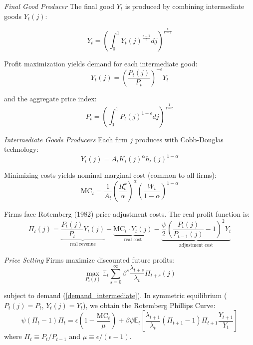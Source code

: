 \documentclass[11pt,preprint]{elsarticle}
\numberwithin{equation}{section}
\numberwithin{figure}{section}
\numberwithin{table}{section}
\begin{document}
\newpage

\emph{Final Good Producer} The final good \(Y_t\) is produced by
combining intermediate goods \(Y_t(j)\):

\begin{equation}
Y_t = \left( \int_0^1 Y_t(j)^{\frac{\epsilon-1}{\epsilon}} dj \right)^{\frac{\epsilon}{\epsilon-1}}
\label{final_good_production}
\end{equation}

Profit maximization yields demand for each intermediate good:
\begin{equation}
Y_t(j) = \left( \frac{P_t(j)}{P_t} \right)^{-\epsilon} Y_t
\label{demand_intermediate}
\end{equation}

and the aggregate price index: \begin{equation}
P_t = \left( \int_0^1 P_t(j)^{1-\epsilon} dj \right)^{\frac{1}{1-\epsilon}}
\label{price_index}
\end{equation}

\emph{Intermediate Goods Producers} Each firm \(j\) produces with
Cobb-Douglas technology: \begin{equation}
Y_t(j) = A_t K_t(j)^{\alpha} h_t(j)^{1-\alpha}
\label{intermediate_production}
\end{equation}

Minimizing costs yields nominal marginal cost (common to all firms):
\begin{equation}
\text{MC}_t = \frac{1}{A_t} \left( \frac{R_t^k}{\alpha} \right)^{\alpha} \left( \frac{W_t}{1-\alpha} \right)^{1-\alpha}
\label{marginal_cost}
\end{equation}

Firms face Rotemberg (1982) price adjustment costs. The real profit
function is: \begin{equation}
\Pi_t(j) = \underbrace{\frac{P_t(j)}{P_t} Y_t(j)}_{\text{real revenue}} - \underbrace{\text{MC}_t \cdot Y_t(j)}_{\text{real cost}} - \underbrace{\frac{\psi}{2} \left( \frac{P_t(j)}{P_{t-1}(j)} - 1 \right)^2 Y_t}_{\text{adjustment cost}}
\label{firm_profit}
\end{equation}

\emph{Price Setting} Firms maximize discounted future profits:
\begin{equation}
\max_{P_t(j)} \mathbb{E}_t \sum_{s=0}^{\infty} \beta^s \frac{\lambda_{t+s}}{\lambda_t} \Pi_{t+s}(j)
\label{firm_objective}
\end{equation}

subject to demand (\ref{demand_intermediate}). In symmetric equilibrium
(\(P_t(j) = P_t\), \(Y_t(j) = Y_t\)), we obtain the Rotemberg Phillips
Curve: \begin{equation}
\psi (\Pi_t - 1) \Pi_t = \epsilon \left(1 - \frac{\text{MC}_t}{\mu}\right) + \beta \psi \mathbb{E}_t \left[ \frac{\lambda_{t+1}}{\lambda_t} (\Pi_{t+1} - 1) \Pi_{t+1} \frac{Y_{t+1}}{Y_t} \right]
\label{phillips_curve}
\end{equation} where \(\Pi_t \equiv P_t/P_{t-1}\) and
\(\mu \equiv \epsilon/(\epsilon-1)\).
\end{document}
